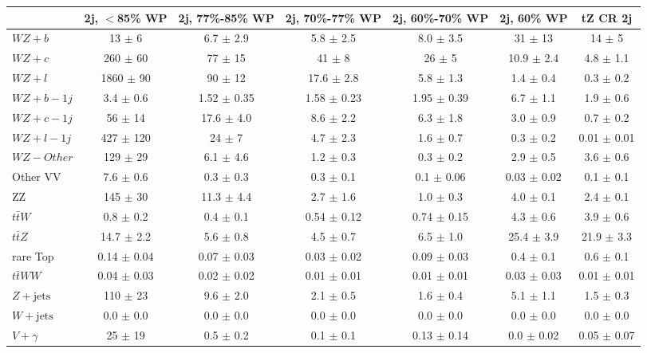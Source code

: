 \begin{tabular}{|l|c|c|c|c|c|c|}
\hline 
 & {2j, $<$85\% WP} & {2j, 77\%-85\% WP} & {2j, 70\%-77\% WP} & {2j, 60\%-70\% WP} & {2j, 60\% WP} & {tZ CR 2j}\\
\hline 
  $WZ + b$   & 13 $\pm$ 6 & 6.7 $\pm$ 2.9 & 5.8 $\pm$ 2.5 & 8.0 $\pm$ 3.5 & 31 $\pm$ 13 & 14 $\pm$ 5 \\ 
  $WZ + c$   & 260 $\pm$ 60 & 77 $\pm$ 15 & 41 $\pm$ 8 & 26 $\pm$ 5 & 10.9 $\pm$ 2.4 & 4.8 $\pm$ 1.1 \\ 
  $WZ + l$   & 1860 $\pm$ 90 & 90 $\pm$ 12 & 17.6 $\pm$ 2.8 & 5.8 $\pm$ 1.3 & 1.4 $\pm$ 0.4 & 0.3 $\pm$ 0.2 \\ 
  $WZ + b - 1j$   & 3.4 $\pm$ 0.6 & 1.52 $\pm$ 0.35 & 1.58 $\pm$ 0.23 & 1.95 $\pm$ 0.39 & 6.7 $\pm$ 1.1 & 1.9 $\pm$ 0.6 \\
  $WZ + c - 1j$   & 56 $\pm$ 14 & 17.6 $\pm$ 4.0 & 8.6 $\pm$ 2.2 & 6.3 $\pm$ 1.8 & 3.0 $\pm$ 0.9 & 0.7 $\pm$ 0.2 \\
  $WZ + l - 1j$   & 427 $\pm$ 120 & 24 $\pm$ 7 & 4.7 $\pm$ 2.3 & 1.6 $\pm$ 0.7 & 0.3 $\pm$ 0.2 & 0.01 $\pm$ 0.01 \\
  $WZ - Other$   & 129 $\pm$ 29 & 6.1 $\pm$ 4.6 & 1.2 $\pm$ 0.3 & 0.3 $\pm$ 0.2 & 2.9 $\pm$ 0.5 & 3.6 $\pm$ 0.6 \\
  Other VV   & 7.6 $\pm$ 0.6 & 0.3 $\pm$ 0.3 & 0.3 $\pm$ 0.1 & 0.1 $\pm$ 0.06 & 0.03 $\pm$ 0.02 & 0.1 $\pm$ 0.1 \\ 
  ZZ  & 145 $\pm$ 30 & 11.3 $\pm$ 4.4 & 2.7 $\pm$ 1.6 & 1.0 $\pm$ 0.3 & 4.0 $\pm$ 0.1 & 2.4 $\pm$ 0.1 \\ 
  $t\bar{t}W$   & 0.8 $\pm$ 0.2 & 0.4 $\pm$ 0.1 & 0.54 $\pm$ 0.12 & 0.74 $\pm$ 0.15 & 4.3 $\pm$ 0.6 & 3.9 $\pm$ 0.6 \\ 
  $t\bar{t}Z$   & 14.7 $\pm$ 2.2 & 5.6 $\pm$ 0.8 & 4.5 $\pm$ 0.7 & 6.5 $\pm$ 1.0 & 25.4 $\pm$ 3.9 & 21.9 $\pm$ 3.3 \\ 
  rare Top   & 0.14 $\pm$ 0.04 & 0.07 $\pm$ 0.03 & 0.03 $\pm$ 0.02 & 0.09 $\pm$ 0.03 & 0.4 $\pm$ 0.1 & 0.6 $\pm$ 0.1 \\ 
  $t\bar{t}WW$   & 0.04 $\pm$ 0.03 & 0.02 $\pm$ 0.02 & 0.01 $\pm$ 0.01 & 0.01 $\pm$ 0.01 & 0.03 $\pm$ 0.03 & 0.01 $\pm$ 0.01 \\ 
  $Z+\text{jets}$   & 110 $\pm$ 23 & 9.6 $\pm$ 2.0 & 2.1 $\pm$ 0.5 & 1.6 $\pm$ 0.4 & 5.1 $\pm$ 1.1 & 1.5 $\pm$ 0.3 \\ 
  $W+\text{jets}$   & 0.0 $\pm$ 0.0 & 0.0 $\pm$ 0.0 & 0.0 $\pm$ 0.0 & 0.0 $\pm$ 0.0 & 0.0 $\pm$ 0.0 & 0.0 $\pm$ 0.0 \\ 
  $V+\gamma$   & 25 $\pm$ 19 & 0.5 $\pm$ 0.2 & 0.1 $\pm$ 0.1 & 0.13 $\pm$ 0.14 & 0.0 $\pm$ 0.02 & 0.05 $\pm$ 0.07 \\ 

\end{tabular}
